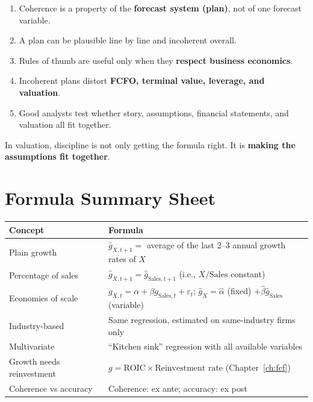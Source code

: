 \begin{enumerate}
  \item Coherence is a property of the \textbf{forecast system (plan)}, not of one forecast variable.
  \item A plan can be plausible line by line and incoherent overall.
  \item Rules of thumb are useful only when they \textbf{respect business economics}.
  \item Incoherent plans distort \textbf{FCFO, terminal value, leverage, and valuation}.
  \item Good analysts test whether story, assumptions, financial statements, and valuation all fit together.
\end{enumerate}
\begin{keybox}
In valuation, discipline is not only getting the formula right. It is \textbf{making the assumptions fit together}.
\end{keybox}

\section{Formula Summary Sheet}

\begin{center}
\small
\renewcommand{\arraystretch}{1.4}
\begin{tabular}{@{}p{5.2cm}p{9.8cm}@{}}
\toprule
\textbf{Concept} & \textbf{Formula}\\
\midrule
Plain growth & $\hat g_{X,t+1}=$ average of the last 2--3 annual growth rates of $X$\\
Percentage of sales & $\hat g_{X,t+1}=\hat g_{\text{Sales},t+1}$ (i.e., $X/\text{Sales}$ constant)\\
Economies of scale & $g_{X,t}=\alpha+\beta g_{\text{Sales},t}+\varepsilon_t$; $\hat g_X=\hat\alpha$ (fixed) $+\hat\beta\hat g_{\text{Sales}}$ (variable)\\
Industry-based & Same regression, estimated on same-industry firms only\\
Multivariate & ``Kitchen sink'' regression with all available variables\\
Growth needs reinvestment & $g=\text{ROIC}\times\text{Reinvestment rate}$ (Chapter~\ref{ch:fcf})\\
Coherence vs accuracy & Coherence: ex ante; accuracy: ex post\\
\bottomrule
\end{tabular}
\end{center}


